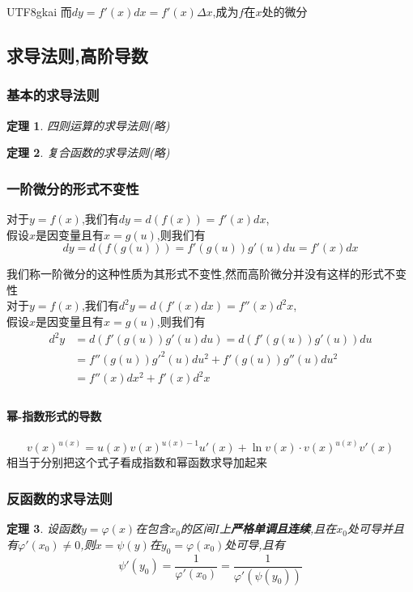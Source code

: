 \documentclass{article}
\newtheorem{theorem}{定理}[subsection]
\begin{document}
\begin{CJK}{UTF8}{gkai}
而$dy = f'(x) dx = f'(x) \Delta x$,成为$f$在$x$处的微分
\subsection{求导法则,高阶导数}
\subsubsection{基本的求导法则}
\begin{theorem}
  四则运算的求导法则(略)
\end{theorem}

\begin{theorem}
  复合函数的求导法则(略)
\end{theorem}

\subsubsection{一阶微分的形式不变性}
对于$y=f(x)$,我们有$dy = d(f(x)) = f'(x) dx$,\\
假设$x$是因变量且有$x=g(u)$,则我们有
\[dy = d(f(g(u))) = f'(g(u)) g'(u)du = f'(x) dx\]

我们称一阶微分的这种性质为其形式不变性,然而高阶微分并没有这样的形式不变性\\
对于$y=f(x)$,我们有$d^2y = d(f'(x) dx) = f''(x) d^2x$,\\
假设$x$是因变量且有$x=g(u)$,则我们有
\[
\begin{aligned}    
d^2y &= d(f'(g(u)) g'(u)du) = d(f'(g(u)) g'(u))du \\
&= f''(g(u))g'^2(u) du^2 + f'(g(u)) g''(u) du^2 \\
&= f''(x) dx^2 + f'(x) d^2 x\\
\end{aligned}
\]

\paragraph{幂-指数形式的导数}
\[v(x)^{u(x)} = u(x)v(x)^{u(x) - 1} u'(x)+ \ln v(x) \cdot v(x)^{u(x)}  v'(x) \]
相当于分别把这个式子看成指数和幂函数求导加起来

\subsubsection{反函数的求导法则}

\begin{theorem}
  设函数$y = \varphi(x)$在包含$x_0$的区间$I$上\textbf{严格单调且连续},且在$x_0$处可导并且有$\varphi'(x_0) \neq 0$,则$x = \psi(y)$在$y_0 = \varphi(x_0)$处可导,且有
  \[\psi'(y_0) = \dfrac{1}{\varphi'(x_0)} = \dfrac{1}{\varphi'(\psi(y_0))}\]
\end{theorem}


\end{CJK}
\end{document}
